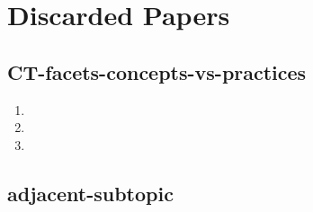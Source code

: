 \documentclass{article}
\begin{document}
\section{Discarded Papers}
\subsection{CT-facets-concepts-vs-practices}
\begin{enumerate}
\item {}
\item {}
\item {}
\end{enumerate}

\subsection{adjacent-subtopic}
\end{document}
